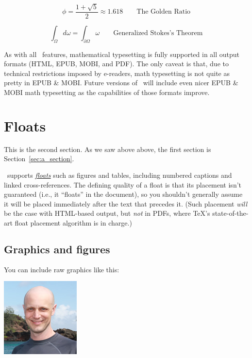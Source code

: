 \begin{equation}
\label{eq:golden_ratio}
\phi = \frac{1+\sqrt{5}}{2} \approx 1.618 \qquad{\text{The Golden Ratio}}
\end{equation}

\begin{equation}
\label{eq:stokes_theorem}
\int_\Omega d\omega = \int_{\partial\Omega} \omega \qquad{\text{Generalized Stokes's Theorem}}
\end{equation}

As with all \PolyTeXnic\ features, mathematical typesetting is fully supported in all output formats (HTML, EPUB, MOBI, and PDF). The only caveat is that, due to technical restrictions imposed by e-readers, math typesetting is not quite as pretty in EPUB \& MOBI. Future versions of \PolyTeXnic\ will include even nicer EPUB \& MOBI math typesetting as the capabilities of those formats improve.

\section{Floats}
\label{sec:floats}

This is the second section. As we saw above above, the first section is Section~\ref{sec:a_section}.

\PolyTeXnic\ supports \href{http://en.wikibooks.org/wiki/LaTeX/Floats,_Figures_and_Captions}{\emph{floats}} such as figures and tables, including numbered captions and linked cross-references. The defining quality of a float is that its placement isn't guaranteed (i.e., it ``floats'' in the document), so you shouldn't generally assume it will be placed immediately after the text that precedes it. (Such placement \emph{will} be the case with HTML-based output, but \emph{not} in PDFs, where \TeX's state-of-the-art float placement algorithm is in charge.)

\subsection{Graphics and figures}
\label{sec:graphics_and_figures}

You can include raw graphics like this:

\includegraphics{images/2011_michael_hartl.png}

